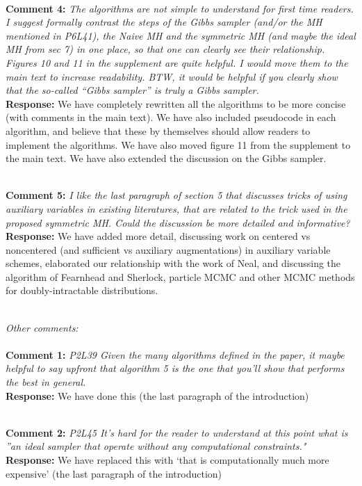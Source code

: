 \documentclass[11pt]{article}
\newcommand{\rev}[2]{\textbf{Comment #1: }\emph{#2}}
\newcommand{\resp}{\textbf{Response: }}
\begin{document}
~\\
\rev{4}{The algorithms are not simple to understand for first time readers. I suggest formally contrast the steps of the Gibbs sampler (and/or the MH mentioned in P6L41), the Naive MH and the symmetric MH (and maybe the ideal MH from sec 7) in one place, so that one can clearly see their relationship.  Figures 10 and 11 in the supplement are quite helpful. I would move them to the main text to increase readability.
BTW, it would be helpful if you clearly show that the so-called “Gibbs sampler” is truly a Gibbs sampler.}
\\ 
\resp We have completely rewritten all the algorithms to be more concise (with comments in the main text). We have also included pseudocode in each algorithm, and believe that these by themselves should allow readers to implement the algorithms. We have also moved figure 11 from the supplement to the main text. We have also extended the discussion on the Gibbs sampler.

~\\
\noindent \rev{5}{I like the last paragraph of section 5 that discusses tricks of using auxiliary variables in
existing literatures, that are related to the trick used in the proposed symmetric MH.
Could the discussion be more detailed and informative?
} \\
\resp{We have added more detail, discussing work on centered vs noncentered (and sufficient vs auxiliary augmentations) in auxiliary variable schemes, elaborated our relationship with the work of Neal, and discussing the algorithm of Fearnhead and Sherlock, particle MCMC and other MCMC methods for doubly-intractable distributions.}

~\\
{\emph{Other comments: }}\\~\\
\noindent \rev{1}{P2L39 Given the many algorithms defined in the paper, it maybe helpful to say upfront that algorithm 5 is the one that you’ll show that performs the best in general.}\\
\resp We have done this (the last paragraph of the introduction)

~\\
\noindent \rev{2}{P2L45 It’s hard for the reader to understand at this point what is ”an ideal sampler that operate without any computational constraints."}\\
\resp We have replaced this with `that is computationally much more expensive' (the last paragraph of the introduction)
\end{document}
